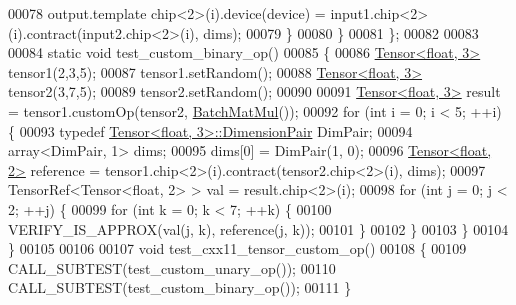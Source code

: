 \begin{DoxyCode}
00078       output.template chip<2>(i).device(device) = input1.chip<2>(i).contract(input2.chip<2>(i), dims);
00079     \}
00080   \}
00081 \};
00082 
00083 
00084 \textcolor{keyword}{static} \textcolor{keywordtype}{void} test\_custom\_binary\_op()
00085 \{
00086   \hyperlink{class_eigen_1_1_tensor}{Tensor<float, 3>} tensor1(2,3,5);
00087   tensor1.setRandom();
00088   \hyperlink{class_eigen_1_1_tensor}{Tensor<float, 3>} tensor2(3,7,5);
00089   tensor2.setRandom();
00090 
00091   \hyperlink{class_eigen_1_1_tensor}{Tensor<float, 3>} result = tensor1.customOp(tensor2, 
      \hyperlink{struct_batch_mat_mul}{BatchMatMul}());
00092   \textcolor{keywordflow}{for} (\textcolor{keywordtype}{int} i = 0; i < 5; ++i) \{
00093     \textcolor{keyword}{typedef} \hyperlink{class_eigen_1_1_tensor}{Tensor<float, 3>::DimensionPair} DimPair;
00094     array<DimPair, 1> dims;
00095     dims[0] = DimPair(1, 0);
00096     \hyperlink{class_eigen_1_1_tensor}{Tensor<float, 2>} reference = tensor1.chip<2>(i).contract(tensor2.chip<2>(i), dims);
00097     TensorRef<Tensor<float, 2> > val = result.chip<2>(i);
00098     \textcolor{keywordflow}{for} (\textcolor{keywordtype}{int} j = 0; j < 2; ++j) \{
00099       \textcolor{keywordflow}{for} (\textcolor{keywordtype}{int} k = 0; k < 7; ++k) \{
00100         VERIFY\_IS\_APPROX(val(j, k), reference(j, k));
00101       \}
00102     \}
00103   \}
00104 \}
00105 
00106 
00107 \textcolor{keywordtype}{void} test\_cxx11\_tensor\_custom\_op()
00108 \{
00109   CALL\_SUBTEST(test\_custom\_unary\_op());
00110   CALL\_SUBTEST(test\_custom\_binary\_op());
00111 \}
\end{DoxyCode}
